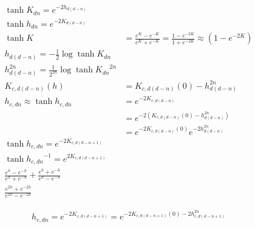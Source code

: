 \documentclass[11pt]{article}
\begin{document}
\begin{equation}
    \begin{aligned}
        \tanh{K_{dn}} = e^{-2h_{d(d-n)}}\\
        \tanh{h_{dn}} = e^{-2K_{d(d-n)}}\\
        \tanh{K} &= \frac{e^{K} - e^{-K}}{e^{K} + e^{-K}} = \frac{1 - e^{-2K}}{1 + e^{-2K}} \approx (1 - e^{-2K})\\
        h_{d(d-n)} = -\frac{1}{2} \log{\tanh{K_{dn}}}\\
        h^{2n}_{d(d-n)} = \frac{1}{2^{2n}} \log{\tanh{K_{dn}}}^{2n}\\
        K_{c,d(d-n)}(h) &= K_{c,d(d-n)}(0) - h_{d(d-n)}^{2n}\\
        h_{c,dn} \approx \tanh{h_{c,dn}} &= e^{-2K_{c,d(d-n)}}\\
        &= e^{-2 (K_{c,d(d-n)}(0) - h_{d(d-n)}^{2n})}\\
        &= e^{-2 K_{c,d(d-n)}(0)} e^{-2 h_{d(d-n)}^{2n}}\\
        \tanh{h_{c,dn}} = e^{-2K_{c,d(d-n+1)}}\\
        \tanh{h_{c,dn}}^{-1} = e^{2K_{c,d(d-n+1)}}\\
        \frac{e^{h} - e^{-h}}{e^{h} + e^{-h}} + \frac{e^{h} + e^{-h}}{e^{h} - e^{-h}}\\
        \frac{e^{2h} + e^{-2h}}{e^{2h} - e^{-2h}}
    \end{aligned}
\end{equation}

\begin{equation}
    \begin{aligned}
        h_{c,dn} = e^{-2K_{c,d(d-n+1)}} = e^{-2K_{c,d(d-n+1)}(0) -2 h_{c,d(d-n+1)}^{2n}}
    \end{aligned}
\end{equation}

        



\end{document}
